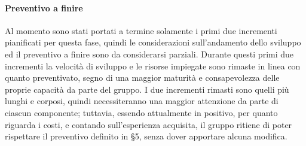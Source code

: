 		\paragraph{Preventivo a finire}
			Al momento sono stati portati a termine solamente i primi due incrementi pianificati per questa fase, quindi le considerazioni sull'andamento dello sviluppo ed il preventivo a finire sono da considerarsi parziali.
			\newline
			Durante questi primi due incrementi la velocità di sviluppo e le risorse impiegate sono rimaste in linea con quanto preventivato, segno di una maggior maturità e consapevolezza delle proprie capacità da parte del gruppo.
			\newline
			I due incrementi rimasti sono quelli più lunghi e corposi, quindi necessiteranno una maggior attenzione da parte di ciascun componente; tuttavia, essendo attualmente in positivo, per quanto riguarda i costi, e contando sull'esperienza acquisita, il gruppo ritiene di poter rispettare il preventivo definito in \S5, senza dover apportare alcuna modifica.
	
		
